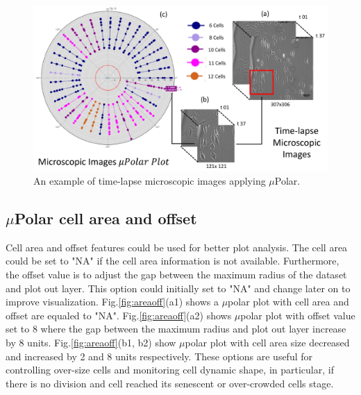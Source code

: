 \documentclass[conference]{IEEEtran}
\begin{document}
\begin{figure}
\centering
\includegraphics[width=\textwidth,height=10 cm]{Patterns/microscopic.pdf}
\caption{ An example of time-lapse microscopic images applying  $\mu$Polar.}
\label{fig:scopic}
\end{figure}


\subsection{$\mu$Polar cell area and offset}
Cell area and offset features could be used for better plot analysis. The cell area could be set to "NA" if the cell area information is not available. Furthermore, the offset value is to adjust the gap between the maximum radius of the dataset and plot out layer. This option could initially set to "NA" and change later on to improve visualization. Fig.\ref{fig:areaoff}(a1) shows a $\mu$polar plot with cell area and offset are equaled to "NA". Fig.\ref{fig:areaoff}(a2) shows $\mu$polar plot with offset value set to 8 where the gap between the maximum radius and plot out layer increase by 8 units. Fig.\ref{fig:areaoff}(b1, b2) show $\mu$polar plot with cell area size decreased and increased by 2 and 8 units respectively. These options are useful for controlling over-size cells and monitoring cell dynamic shape, in particular, if there is no division and cell reached its senescent or over-crowded cells stage.    
\end{document}
